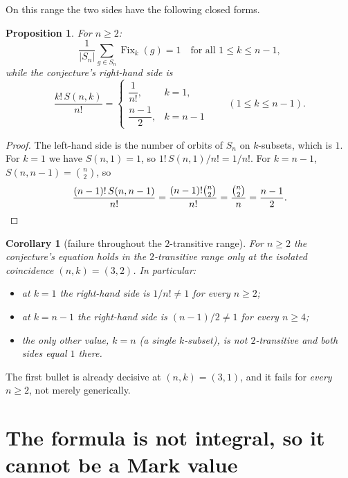\documentclass[11pt]{article}
\newtheorem{corollary}[theorem]{Corollary}
\newtheorem{proposition}[theorem]{Proposition}
\theoremstyle{definition}
\theoremstyle{remark}
\newcommand{\Sn}{S_n}
\newcommand{\Fix}{\operatorname{Fix}}
\newcommand{\Stir}[2]{S(#1,#2)}
\begin{document}
\noindent On this range the two sides have the following closed forms.

\begin{proposition}\label{prop:closed}
For $n \ge 2$:
\[
\frac{1}{|\Sn|}\sum_{g \in \Sn}\Fix_k(g) = 1
\quad\text{for all } 1 \le k \le n-1,
\]
while the conjecture's right-hand side is
\[
\frac{k!\,\Stir{n}{k}}{n!}
=
\begin{cases}
\dfrac{1}{n!}, & k = 1,\\[2mm]
\dfrac{n-1}{2}, & k = n-1
\end{cases}
\qquad (1 \le k \le n-1).
\]
\end{proposition}

\begin{proof}
The left-hand side is the number of orbits of $\Sn$ on $k$-subsets, which is
$1$. For $k=1$ we have $\Stir{n}{1}=1$, so $1!\,\Stir{n}{1}/n! = 1/n!$. For
$k=n-1$, $\Stir{n}{n-1}=\binom{n}{2}$, so
\[
\frac{(n-1)!\,\Stir{n}{n-1}}{n!}
= \frac{(n-1)!\binom{n}{2}}{n!}
= \frac{\binom{n}{2}}{n}
= \frac{n-1}{2}. \qedhere
\]
\end{proof}

\begin{corollary}[failure throughout the $2$-transitive range]
For $n \ge 2$ the conjecture's equation holds in the $2$-transitive range only
at the isolated coincidence $(n,k)=(3,2)$. In particular:
\begin{itemize}
\item at $k=1$ the right-hand side is $1/n! \ne 1$ for every $n \ge 2$;
\item at $k=n-1$ the right-hand side is $(n-1)/2 \ne 1$ for every $n \ge 4$;
\item the only other value, $k=n$ (a single $k$-subset), is not
  $2$-transitive and both sides equal $1$ there.
\end{itemize}
\end{corollary}

The first bullet is already decisive at $(n,k)=(3,1)$, and it fails for
\emph{every} $n \ge 2$, not merely generically.

\section{The formula is not integral, so it cannot be a Mark value}
\label{sec:nonintegral}
\end{document}

